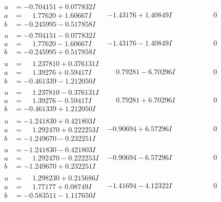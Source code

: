 \documentclass[1p]{elsarticle_modified}
\theoremstyle{definition}
\begin{document}
$$\begin{array}{c|c|c}
\begin{aligned}
u &= -0.704151 + 0.077832 I \\
a &= \phantom{-}1.77620 + 1.60667 I \\
b &= -0.245995 - 0.517858 I\end{aligned}
 & -1.43176 + 1.40849 I & \phantom{-0.000000 } 0 \\ \hline\begin{aligned}
u &= -0.704151 - 0.077832 I \\
a &= \phantom{-}1.77620 - 1.60667 I \\
b &= -0.245995 + 0.517858 I\end{aligned}
 & -1.43176 - 1.40849 I & \phantom{-0.000000 } 0 \\ \hline\begin{aligned}
u &= \phantom{-}1.237810 + 0.376131 I \\
a &= \phantom{-}1.39276 + 0.59417 I \\
b &= -0.461339 - 1.212050 I\end{aligned}
 & \phantom{-}0.79281 - 6.70296 I & \phantom{-0.000000 } 0 \\ \hline\begin{aligned}
u &= \phantom{-}1.237810 - 0.376131 I \\
a &= \phantom{-}1.39276 - 0.59417 I \\
b &= -0.461339 + 1.212050 I\end{aligned}
 & \phantom{-}0.79281 + 6.70296 I & \phantom{-0.000000 } 0 \\ \hline\begin{aligned}
u &= -1.241830 + 0.421803 I \\
a &= \phantom{-}1.292470 + 0.222253 I \\
b &= -1.249670 - 0.232251 I\end{aligned}
 & -0.90694 + 6.57296 I & \phantom{-0.000000 } 0 \\ \hline\begin{aligned}
u &= -1.241830 - 0.421803 I \\
a &= \phantom{-}1.292470 - 0.222253 I \\
b &= -1.249670 + 0.232251 I\end{aligned}
 & -0.90694 - 6.57296 I & \phantom{-0.000000 } 0 \\ \hline\begin{aligned}
u &= \phantom{-}1.298230 + 0.215686 I \\
a &= \phantom{-}1.77177 + 0.08749 I \\
b &= -0.583511 - 1.117650 I\end{aligned}
 & -1.41694 - 4.12322 I & \phantom{-0.000000 } 0 \\ \hline\begin{aligned}

\end{aligned}
\end{array}$$
\end{document}
